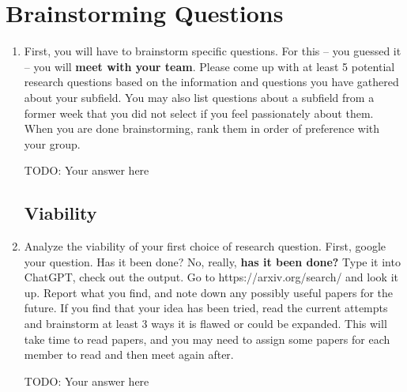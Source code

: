 \documentclass[letterpaper,11pt]{article}
\begin{document}
\section{Brainstorming Questions}
\begin{enumerate}
    \item 
    First, you will have to brainstorm specific questions. For this -- you guessed it -- you will \textbf{meet with your team}. Please come up with at least 5 potential research questions based on the information and questions you have gathered about your subfield. You may also list questions about a subfield from a former week that you did not select if you feel passionately about them. When you are done brainstorming, rank them in order of preference with your group.
    \begin{tcolorbox}
TODO: Your answer here
\newline
\newline
\newline
\newline
\newline
\newline
\newline
\newline
\newline
\newline
\newline
\end{tcolorbox}

\subsection{Viability}
\item 
Analyze the viability of your first choice of research question. First, google your question. Has it been done? No, really, \textbf{has it been done?} Type it into ChatGPT, check out the output. Go to https://arxiv.org/search/ and look it up. Report what you find, and note down any possibly useful papers for the future. 
If you find that your idea has been tried, read the current attempts and brainstorm at least 3 ways it is flawed or could be expanded. This will take time to read papers, and you may need to assign some papers for each member to read and then meet again after.
\begin{tcolorbox}
TODO: Your answer here
\newline
\newline
\newline
\newline
\newline
\newline
\newline
\newline
\newline
\end{tcolorbox}


\end{enumerate}
\end{document}
